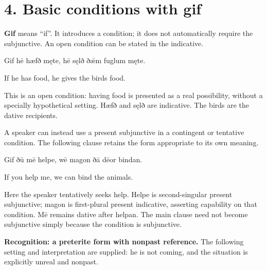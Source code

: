 \section*{4. Basic conditions with gif}

\textbf{Gif} means “if”. It introduces a condition; it does not automatically require the subjunctive. An open condition can be stated in the indicative.

Gif hē hæfð męte, hē sęlð ðǣm fuglum męte.

If he has food, he gives the birds food.

This is an open condition: having food is presented as a real possibility, without a specially hypothetical setting. Hæfð and sęlð are indicative. The birds are the dative recipients.

A speaker can instead use a present subjunctive in a contingent or tentative condition. The following clause retains the form appropriate to its own meaning.

Gif ðū mē helpe, wē magon ðā dēor bindan.

If you help me, we can bind the animals.

Here the speaker tentatively seeks help. Helpe is second-singular present subjunctive; magon is first-plural present indicative, asserting capability on that condition. Mē remains dative after helpan. The main clause need not become subjunctive simply because the condition is subjunctive.

\textbf{Recognition: a preterite form with nonpast reference.} The following setting and interpretation are supplied: he is not coming, and the situation is explicitly unreal and nonpast.

